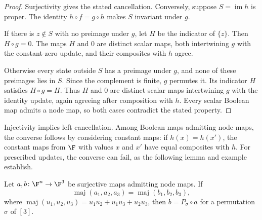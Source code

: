 \begin{proof}
Surjectivity gives the stated cancellation. Conversely, suppose $S=\operatorname{im}h$ is proper. The identity $h\circ f=g\circ h$ makes $S$ invariant under $g$.

If there is $z\notin S$ with no preimage under $g$, let $H$ be the indicator of $\{z\}$. Then $H\circ g=0$. The maps $H$ and $0$ are distinct scalar maps, both intertwining $g$ with the constant-zero update, and their composites with $h$ agree.

Otherwise every state outside $S$ has a preimage under $g$, and none of these preimages lies in $S$. Since the complement is finite, $g$ permutes it. Its indicator $H$ satisfies $H\circ g=H$. Thus $H$ and $0$ are distinct scalar maps intertwining $g$ with the identity update, again agreeing after composition with $h$. Every scalar Boolean map admits a node map, so both cases contradict the stated property.
\end{proof}

Injectivity implies left cancellation. Among Boolean maps admitting node maps, the converse follows by considering constant maps: if $h(x)=h(x')$, the constant maps from $\F$ with values $x$ and $x'$ have equal composites with $h$. For prescribed updates, the converse can fail, as the following lemma and example establish.

\begin{lemma}\label{lem:majority-node-map-rigidity}
Let $a,b\colon\F^n\to\F^3$ be surjective maps admitting node maps. If
\[
    \operatorname{maj}(a_1,a_2,a_3)
    =\operatorname{maj}(b_1,b_2,b_3),
\]
where $\operatorname{maj}(u_1,u_2,u_3)=u_1u_2+u_1u_3+u_2u_3$, then $b=P_\sigma\circ a$ for a permutation $\sigma$ of $[3]$.
\end{lemma}

